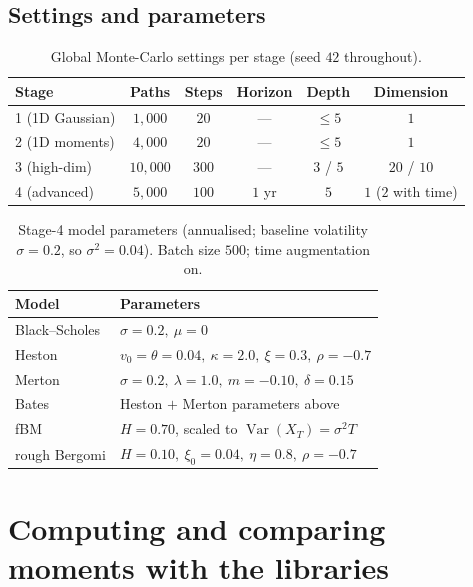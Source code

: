 \documentclass[11pt]{article}
\newcommand{\Var}{\operatorname{Var}}
\begin{document}
\subsection{Settings and parameters}
\begin{table}[H]
\centering
\caption{Global Monte-Carlo settings per stage (seed $42$ throughout).}
\begin{tabular}{@{}lccccc@{}}
\toprule
Stage & Paths & Steps & Horizon & Depth & Dimension \\
\midrule
1 (1D Gaussian) & $1{,}000$ & $20$ & --- & $\le5$ & $1$ \\
2 (1D moments)  & $4{,}000$ & $20$ & --- & $\le5$ & $1$ \\
3 (high-dim)    & $10{,}000$ & $300$ & --- & $3$ / $5$ & $20$ / $10$ \\
4 (advanced)    & $5{,}000$ & $100$ & $1$ yr & $5$ & $1$ ($2$ with time) \\
\bottomrule
\end{tabular}
\end{table}
\begin{table}[H]
\centering
\caption{Stage-4 model parameters (annualised; baseline volatility $\sigma=0.2$,
so $\sigma^2=0.04$). Batch size $500$; time augmentation on.}
\renewcommand{\arraystretch}{1.15}
\begin{tabular}{@{}ll@{}}
\toprule
Model & Parameters \\
\midrule
Black--Scholes & $\sigma=0.2,\ \mu=0$ \\
Heston         & $v_0=\theta=0.04,\ \kappa=2.0,\ \xi=0.3,\ \rho=-0.7$ \\
Merton         & $\sigma=0.2,\ \lambda=1.0,\ m=-0.10,\ \delta=0.15$ \\
Bates          & Heston $+$ Merton parameters above \\
fBM            & $H=0.70$, scaled to $\Var(X_T)=\sigma^2 T$ \\
rough Bergomi  & $H=0.10,\ \xi_0=0.04,\ \eta=0.8,\ \rho=-0.7$ \\
\bottomrule
\end{tabular}
\end{table}

\section{Computing and comparing moments with the libraries}\label{sec:compute}
\end{document}
